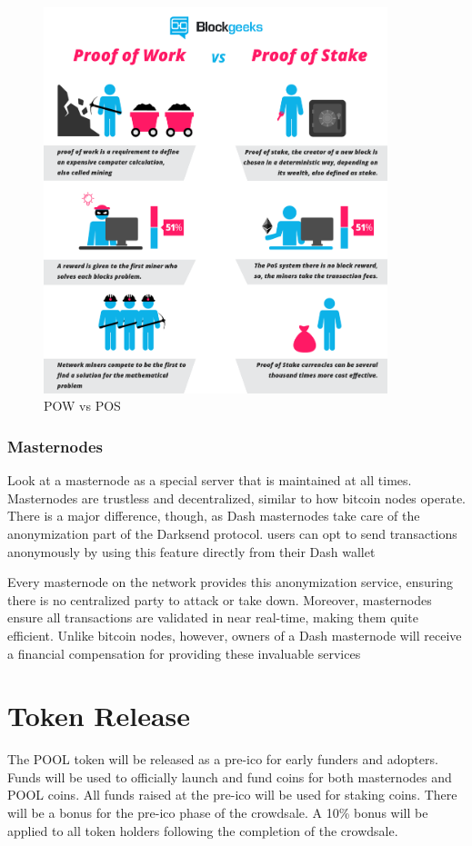 \begin{figure}[h]
\centering
\caption{POW vs POS \cite{blockgeek}}
\includegraphics[width=10cm]{blockgeek.png}
\end{figure}

\subsubsection{Masternodes}
Look at a masternode as a special server that is maintained at all times. Masternodes are trustless and decentralized, similar to how bitcoin nodes operate. There is a major difference, though, as Dash masternodes take care of the anonymization part of the Darksend protocol. users can opt to send transactions anonymously by using this feature directly from their Dash wallet

Every masternode on the network provides this anonymization service, ensuring there is no centralized party to attack or take down. Moreover, masternodes ensure all transactions are validated in near real-time, making them quite efficient. Unlike bitcoin nodes, however, owners of a Dash masternode will receive a financial compensation for providing these invaluable services

\newpage

\section{Token Release}
The POOL token will be released as a pre-ico for early funders and adopters. Funds will be used to officially launch and fund coins for both masternodes and POOL coins. All funds raised at the pre-ico will be used for staking coins. There will be a bonus for the pre-ico phase of the crowdsale. A 10\% bonus will be applied to all token holders following the completion of the crowdsale.   

